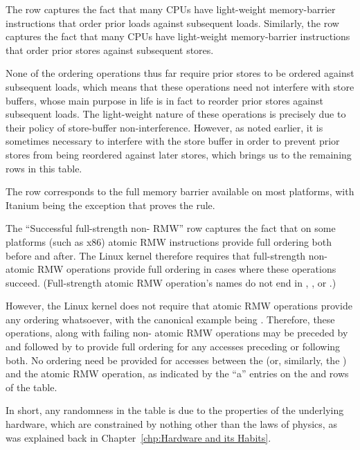 {	The  row captures the fact that many CPUs have
	light-weight memory-barrier instructions that order prior loads against
	subsequent loads.
	Similarly,
	the  row captures the fact that many CPUs have
	light-weight memory-barrier instructions that order prior stores against
	subsequent stores.

	None of the ordering operations thus far require prior stores to be
	ordered against subsequent loads, which means that these operations
	need not interfere with store buffers, whose main purpose in life
	is in fact to reorder prior stores against subsequent loads.
	The light-weight nature of these operations is precisely due to
	their policy of store-buffer non-interference.
	However, as noted earlier, it is sometimes necessary to interfere
	with the store buffer in order to prevent prior stores from being
	reordered against later stores, which brings us to the remaining
	rows in this table.

	The  row corresponds to the full memory barrier
	available on most platforms, with Itanium being the exception
	that proves the rule.

	The ``Successful full-strength non- RMW'' row captures
	the fact that on some platforms (such as x86) atomic RMW instructions
	provide full ordering both before and after.
	The Linux kernel therefore requires that full-strength non-
	atomic RMW operations provide full ordering in cases where these
	operations succeed.
	(Full-strength atomic RMW operation's names do not end in
	, , or .)

	However, the Linux kernel does not require that  atomic
	RMW operations provide any ordering whatsoever, with the
	canonical example being .
	Therefore, these operations, along with failing non-
	atomic RMW operations may be preceded by 
	and followed by  to provide full
	ordering for any accesses preceding or following both.
	No ordering need be provided for accesses between the
	 (or, similarly, the
	) and the atomic RMW operation, as
	indicated by the ``a'' entries on the 
	and  rows of the table.

	In short, any randomness in the table is due to the properties
	of the underlying hardware, which are constrained by nothing other
	than the laws of physics, as was explained back in
	Chapter~\ref{chp:Hardware and its Habits}.
} \QuickQuizEnd

